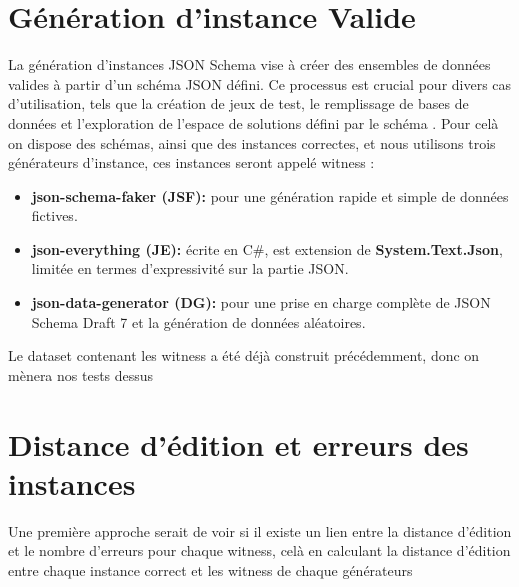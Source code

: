   \section{Génération d'instance Valide}
    La génération d'instances JSON Schema vise à créer des ensembles de données valides à partir d'un schéma JSON défini. Ce processus 
    est crucial pour divers cas d'utilisation, tels que la création de jeux de test, le remplissage de bases de données et l'exploration 
    de l'espace de solutions défini par le schéma \cite{GENERATION}. Pour celà on dispose des schémas, ainsi que des instances correctes, et nous utilisons trois générateurs d'instance, ces instances seront appelé witness : 
      \begin{itemize}
          \item [\textbullet] \textbf{json-schema-faker (JSF):} pour une génération rapide et simple de données fictives\cite{faker}.
          \item [\textbullet] \textbf{json-everything (JE):} écrite en C\#, est extension de \textbf{System.Text.Json}, limitée en termes d'expressivité sur la partie JSON\cite{everything}.
          \item [\textbullet] \textbf{json-data-generator (DG):} pour une prise en charge complète de JSON Schema Draft 7 et la génération de données aléatoires\cite{data_generator}.
      \end{itemize}

    
    Le dataset contenant les witness a été déjà construit précédemment, donc on mènera nos tests dessus
      
  \section{Distance d'édition et erreurs des instances}
    Une première approche serait de voir si il existe un lien entre la distance d'édition et le nombre d'erreurs pour chaque witness, celà en calculant la distance d'édition 
    entre chaque instance correct et les witness de chaque générateurs
